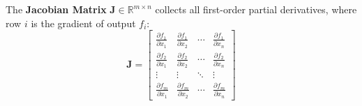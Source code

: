 The \textbf{Jacobian Matrix} $\mathbf{J} \in \mathbb{R}^{m \times n}$ collects all first-order partial derivatives, where row $i$ is the gradient of output $f_i$:
\begin{equation}
\mathbf{J} = \begin{bmatrix}
\frac{\partial f_1}{\partial x_1} & \frac{\partial f_1}{\partial x_2} & \cdots & \frac{\partial f_1}{\partial x_n} \\[2mm]
\frac{\partial f_2}{\partial x_1} & \frac{\partial f_2}{\partial x_2} & \cdots & \frac{\partial f_2}{\partial x_n} \\[2mm]
\vdots & \vdots & \ddots & \vdots \\[2mm]
\frac{\partial f_m}{\partial x_1} & \frac{\partial f_m}{\partial x_2} & \cdots & \frac{\partial f_m}{\partial x_n}
\end{bmatrix}\label{eq:jacobian_matrix}
\end{equation}

